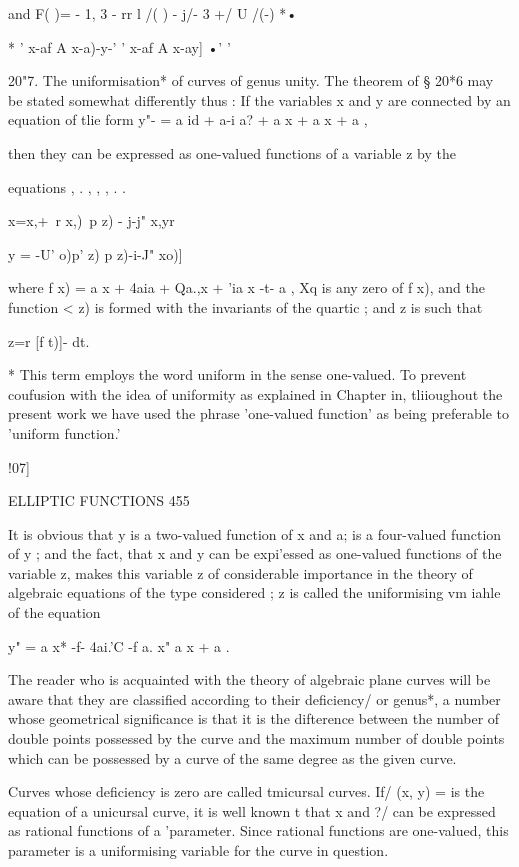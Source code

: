 {and F( )= - 1, 3 - rr l /( ) - j/- 3 +/ U /(-) *•

* ' x-af A x-a)-y-' ' x-af A x-ay] •' '

20"7. The uniformisation* of curves of genus unity. The theorem of §
20*6 may be stated somewhat differently thus : If the variables x and
y are connected by an equation of tlie form y"- = a id + a-i a? + a x
+ a x + a ,

then they can be expressed as one-valued functions of a variable z by
the

equations , . , , , . .

  x=x,+\ r x,)\ p z) - j-j" x,yr

y = -U' o)p' z) p z)-i-J" xo)]

where f x) = a x + 4aia + Qa.,x + 'ia x -t- a , Xq is any zero of f
x), and the function < z) is formed with the invariants of the quartic
; and z is such that

z=r [f t)]- dt.

* This term employs the word uniform in the sense one-valued. To
prevent coufusion with the idea of uniformity as explained in Chapter
in, tliioughout the present work we have used the phrase 'one-valued
function' as being preferable to 'uniform function.'

!07]

ELLIPTIC FUNCTIONS 455

It is obvious that y is a two-valued function of x and a; is a
four-valued function of y ; and the fact, that x and y can be
expi'essed as one-valued functions of the variable z, makes this
variable z of considerable importance in the theory of algebraic
equations of the type considered ; z is called the uniformising vm
iahle of the equation

y" = a x* -f- 4ai.'C -f a. x" a x + a .

The reader who is acquainted with the theory of algebraic plane curves
will be aware that they are classified according to their deficiency/
or genus*, a number whose geometrical significance is that it is the
difterence between the number of double points possessed by the curve
and the maximum number of double points which can be possessed by a
curve of the same degree as the given curve.

Curves whose deficiency is zero are called tmicursal curves. If/ (x,
y) = is the equation of a unicursal curve, it is well known t that x
and ?/ can be expressed as rational functions of a 'parameter. Since
rational functions are one-valued, this parameter is a uniformising
variable for the curve in question.

}
